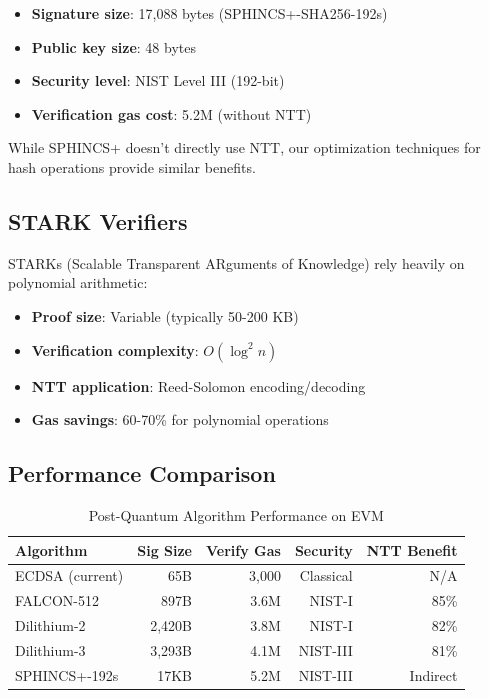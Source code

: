 \begin{itemize}
\item \textbf{Signature size}: 17,088 bytes (SPHINCS+-SHA256-192s)
\item \textbf{Public key size}: 48 bytes
\item \textbf{Security level}: NIST Level III (192-bit)
\item \textbf{Verification gas cost}: 5.2M (without NTT)
\end{itemize}

While SPHINCS+ doesn't directly use NTT, our optimization techniques for hash operations provide similar benefits.

\subsection{STARK Verifiers}

STARKs (Scalable Transparent ARguments of Knowledge) rely heavily on polynomial arithmetic:

\begin{itemize}
\item \textbf{Proof size}: Variable (typically 50-200 KB)
\item \textbf{Verification complexity}: $O(\log^2 n)$
\item \textbf{NTT application}: Reed-Solomon encoding/decoding
\item \textbf{Gas savings}: 60-70\% for polynomial operations
\end{itemize}

\subsection{Performance Comparison}

\begin{table}[h]
\centering
\caption{Post-Quantum Algorithm Performance on EVM}
\begin{tabular}{lrrrr}
\toprule
Algorithm & Sig Size & Verify Gas & Security & NTT Benefit \\
\midrule
ECDSA (current) & 65B & 3,000 & Classical & N/A \\
FALCON-512 & 897B & 3.6M & NIST-I & 85\% \\
Dilithium-2 & 2,420B & 3.8M & NIST-I & 82\% \\
Dilithium-3 & 3,293B & 4.1M & NIST-III & 81\% \\
SPHINCS+-192s & 17KB & 5.2M & NIST-III & Indirect \\
\bottomrule
\end{tabular}
\end{table}

